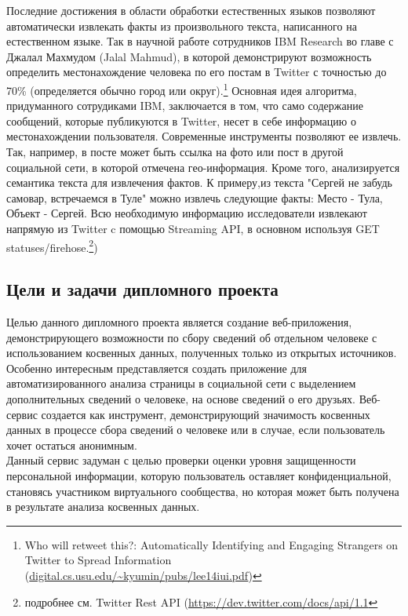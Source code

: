 Последние достижения в области обработки естественных языков позволяют автоматически извлекать факты из произвольного текста, написанного на естественном языке. Так в научной работе сотрудников IBM Research во главе с Джалал Махмудом (Jalal Mahmud), в которой демонстрируют возможность определить местонахождение человека по его постам в Twitter с точностью до 70\% (определяется обычно город или округ).\footnote{Who will retweet this?: Automatically Identifying and Engaging Strangers on Twitter to Spread Information (\url{digital.cs.usu.edu/~kyumin/pubs/lee14iui.pdf‎})}
 Основная идея алгоритма, придуманного сотрудиками IBM, заключается в том, что само содержание сообщений, которые публикуются в Twitter, несет в себе информацию о местонахождении пользователя. Современные  инструменты  позволяют ее извлечь. Так, например, в посте может быть ссылка на фото или пост в другой социальной сети, в которой отмечена гео-информация. Кроме того, анализируется семантика текста для извлечения фактов. К примеру,из текста "Сергей не забудь самовар, встречаемся в Туле" можно извлечь следующие факты: Место - Тула, Объект - Сергей. Всю необходимую информацию исследователи извлекают напрямую из Twitter c помощью Streaming API, в основном используя GET statuses/firehose.\footnote{подробнее см. Twitter Rest API (\url{https://dev.twitter.com/docs/api/1.1}})\\ 


\subsection{Цели и задачи дипломного проекта}

Целью данного дипломного проекта является создание веб-приложения, демонстрирующего  возможности по сбору сведений об отдельном человеке с использованием косвенных данных, полученных только из открытых источников. Особенно интересным представляется создать приложение для автоматизированного анализа страницы в социальной сети с выделением дополнительных сведений о человеке, на основе сведений о его друзьях. Веб-сервис создается как инструмент, демонстрирующий значимость косвенных данных в процессе сбора сведений о человеке или в случае, если пользователь хочет остаться анонимным.\\

Данный сервис задуман с целью проверки оценки уровня защищенности персональной информации, которую пользователь оставляет конфиденциальной, становясь участником виртуального сообщества, но которая может быть получена в результате анализа косвенных данных.
\\

